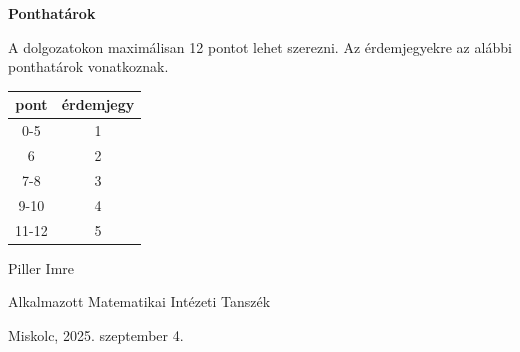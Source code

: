 \documentclass[a4paper,12pt]{article}
\begin{document}
\vskip 1cm

\noindent \textbf{Ponthatárok}

\smallskip

\noindent A dolgozatokon maximálisan 12 pontot lehet szerezni. Az érdemjegyekre az alábbi ponthatárok vonatkoznak.

\begin{center}
\begin{tabular}{|c|c|}
pont & érdemjegy \\
\hline
0-5 & 1 \\
6 & 2 \\
7-8 & 3 \\
9-10 & 4 \\
11-12 & 5 \\
\hline
\end{tabular}
\end{center}

\vskip 18mm

\hskip 10cm Piller Imre

\hskip 7cm Alkalmazott Matematikai Intézeti Tanszék

\vskip 5mm

\noindent Miskolc, 2025. szeptember 4.
\end{document}
